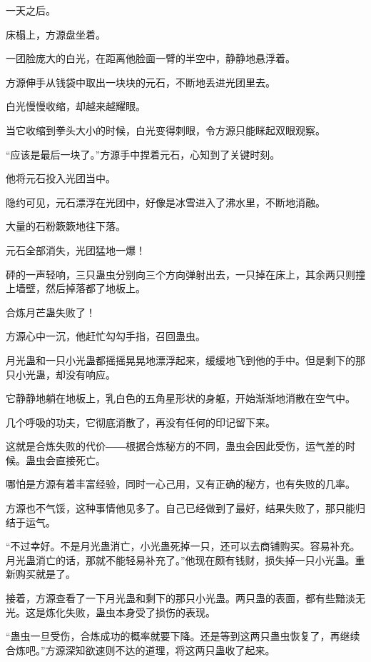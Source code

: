 
\begin{this_body}

一天之后。

床榻上，方源盘坐着。

一团脸庞大的白光，在距离他脸面一臂的半空中，静静地悬浮着。

方源伸手从钱袋中取出一块块的元石，不断地丢进光团里去。

白光慢慢收缩，却越来越耀眼。

当它收缩到拳头大小的时候，白光变得刺眼，令方源只能眯起双眼观察。

“应该是最后一块了。”方源手中捏着元石，心知到了关键时刻。

他将元石投入光团当中。

隐约可见，元石漂浮在光团中，好像是冰雪进入了沸水里，不断地消融。

大量的石粉簌簌地往下落。

元石全部消失，光团猛地一爆！

砰的一声轻响，三只蛊虫分别向三个方向弹射出去，一只掉在床上，其余两只则撞上墙壁，然后掉落都了地板上。

合炼月芒蛊失败了！

方源心中一沉，他赶忙勾勾手指，召回蛊虫。

月光蛊和一只小光蛊都摇摇晃晃地漂浮起来，缓缓地飞到他的手中。但是剩下的那只小光蛊，却没有响应。

它静静地躺在地板上，乳白色的五角星形状的身躯，开始渐渐地消散在空气中。

几个呼吸的功夫，它彻底消散了，再没有任何的印记留下来。

这就是合炼失败的代价――根据合炼秘方的不同，蛊虫会因此受伤，运气差的时候。蛊虫会直接死亡。

哪怕是方源有着丰富经验，同时一心己用，又有正确的秘方，也有失败的几率。

方源也不气馁，这种事情他见多了。自己已经做到了最好，结果失败了，那只能归结于运气。

“不过幸好。不是月光蛊消亡，小光蛊死掉一只，还可以去商铺购买。容易补充。月光蛊消亡的话，那就不能轻易补充了。”他现在颇有钱财，损失掉一只小光蛊。重新购买就是了。

接着，方源查看了一下月光蛊和剩下的那只小光蛊。两只蛊的表面，都有些黯淡无光。这是炼化失败，蛊虫本身受了损伤的表现。

“蛊虫一旦受伤，合炼成功的概率就要下降。还是等到这两只蛊虫恢复了，再继续合炼吧。”方源深知欲速则不达的道理，将这两只蛊收了起来。


\end{this_body}
